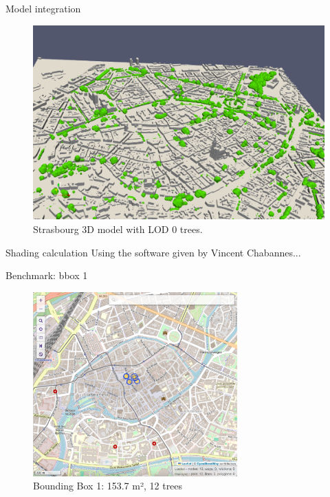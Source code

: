\documentclass[10pt]{beamer}
\begin{document}
\begin{frame}{Model integration}
  \begin{figure}[H]
    \centering
    \includegraphics[width=1\textwidth]{images/stras_lod0.png}
    \caption{Strasbourg 3D model with LOD 0 trees.}
\end{figure}
\end{frame}

\begin{frame}{Shading calculation}
  Using the software given by Vincent Chabannes...

\end{frame}

\begin{frame}{Benchmark: bbox 1}
  \begin{figure}[H]
    \centering
    \includegraphics[width=0.7\textwidth]{images/bbox1.png}
    \caption{Bounding Box 1: 153.7 m², 12 trees}
\end{figure}
\end{frame}
\end{document}
